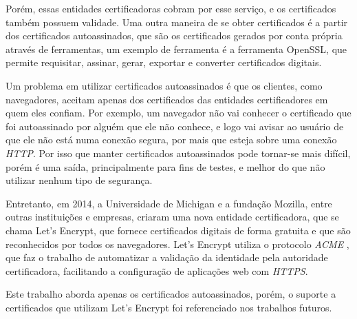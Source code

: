 Porém, essas entidades certificadoras cobram por esse serviço, e os certificados também
possuem validade. Uma outra maneira de se obter certificados é a partir dos certificados
autoassinados, que são os certificados gerados por conta própria através de
ferramentas, um exemplo de ferramenta é a ferramenta OpenSSL, que permite requisitar,
assinar, gerar, exportar e converter certificados digitais.

Um problema em utilizar certificados autoassinados é que os clientes, como navegadores,
aceitam apenas dos certificados das entidades certificadores em quem eles confiam. Por
exemplo, um navegador não vai conhecer o certificado que foi autoassinado por
alguém que ele não conhece, e logo vai avisar ao usuário de que ele não está numa
conexão segura, por mais que esteja sobre uma conexão \textit{HTTP}. Por isso que
 manter certificados
autoassinados pode tornar-se mais difícil, porém é uma saída, principalmente para
fins de testes, e melhor do que não utilizar nenhum tipo de segurança.

Entretanto, em 2014, a Universidade de Michigan e a fundação Mozilla, entre outras 
instituições e empresas, criaram uma nova entidade certificadora, que se chama 
Let's Encrypt, que fornece certificados digitais de forma gratuita e que são 
reconhecidos por todos os navegadores. Let's Encrypt utiliza o protocolo \textit{ACME} \cite{ACME}, que faz o trabalho de automatizar a validação da identidade pela autoridade 
certificadora, facilitando a configuração de aplicações web com \textit{HTTPS}. 

Este trabalho aborda apenas os certificados autoassinados, porém, o suporte
a certificados que utilizam Let's Encrypt foi referenciado nos trabalhos futuros.
